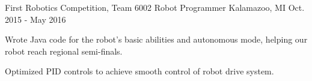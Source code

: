 \documentclass[12pt, a4paper]{awesome-cv}
\begin{document}
\begin{cventries}




  \cventry
    {First Robotics Competition, Team 6002}
    {Robot Programmer}
    {Kalamazoo, MI}
    {Oct. 2015 - May 2016}
    {
      \begin{cvitems}
        \item {Wrote Java code for the robot’s basic abilities and autonomous mode, helping our robot reach regional semi-finals.}
        \item {Optimized PID controls to achieve smooth control of robot drive system.}
      \end{cvitems}
    }



\end{cventries}
\end{document}
